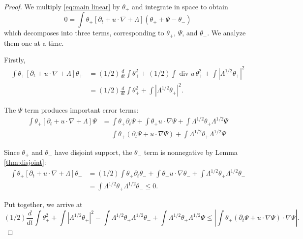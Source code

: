 \documentclass[11pt]{amsart}
\theoremstyle{remark}
\theoremstyle{definition}
\newcommand{\paren}[1]{\left( #1 \right)}
\newcommand{\bracket}[1]{\left[ #1 \right]}
\newcommand{\abs}[1]{\left\lvert #1 \right\rvert}
\newcommand{\del}{\partial}
\newcommand{\grad}{\nabla}
\newcommand{\ddt}{\frac{d}{dt}}
\renewcommand{\div}{\operatorname{div}}
\begin{document}
\begin{proof}
We multiply \eqref{eq:main linear} by $\theta_+$ and integrate in space to obtain
\[ 0 = \int \theta_+ \bracket{ \del_t + u \cdot \grad + \Lambda } \paren{\theta_+ + \Psi - \theta_-} \]
which decomposes into three terms, corresponding to $\theta_+$, $\Psi$, and $\theta_-$.  We analyze them one at a time.  

Firstly,
\begin{align*} 
\int \theta_+ \bracket{ \del_t + u \cdot \grad + \Lambda } \theta_+ &= (1/2) \ddt \int \theta_+^2 + (1/2) \int \div u \, \theta_+^2 + \int \abs{\Lambda^{1/2} \theta_+}^2
\\ &= (1/2) \ddt \int \theta_+^2 + \int \abs{\Lambda^{1/2} \theta_+}^2.
\end{align*}

The $\Psi$ term produces important error terms:
\begin{align*} 
\int \theta_+ \bracket{ \del_t + u \cdot \grad + \Lambda } \Psi &= \int \theta_+ \del_t \Psi + \int \theta_+ u \cdot \grad \Psi + \int \Lambda^{1/2} \theta_+ \Lambda^{1/2} \Psi
\\ &= \int \theta_+ (\del_t \Psi + u \cdot \grad \Psi) + \int \Lambda^{1/2} \theta_+ \Lambda^{1/2} \Psi
\end{align*}

Since $\theta_+$ and $\theta_-$ have disjoint support, the $\theta_-$ term is nonnegative by Lemma \ref{thm:disjoint}:
\begin{align*} 
\int \theta_+ \bracket{ \del_t + u \cdot \grad + \Lambda } \theta_- &= (1/2) \int \theta_+ \del_t \theta_- + \int \theta_+ u \cdot \grad \theta_- + \int \Lambda^{1/2} \theta_+ \Lambda^{1/2} \theta_-
\\ &= \int \Lambda^{1/2} \theta_+ \Lambda^{1/2} \theta_- \leq 0.
\end{align*}

Put together, we arrive at 
\[ (1/2) \ddt \int \theta_+^2 + \int \abs{\Lambda^{1/2} \theta_+}^2 - \int \Lambda^{1/2}\theta_+ \Lambda^{1/2} \theta_- + \int \Lambda^{1/2} \theta_+ \Lambda^{1/2} \Psi \leq \abs{\int \theta_+ (\del_t \Psi + u \cdot \grad \Psi) \cdot \grad \Psi}. \]


\end{proof}
\end{document}
